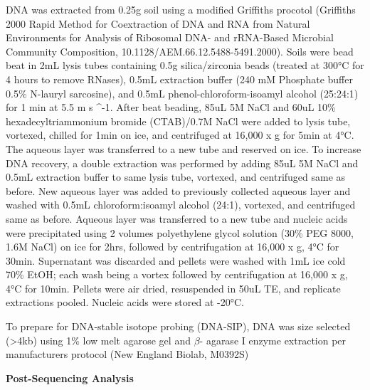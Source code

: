 DNA was extracted from 0.25g soil using a modified Griffiths procotol (Griffiths 2000 Rapid Method for Coextraction of DNA and RNA from Natural Environments for Analysis of Ribosomal DNA- and rRNA-Based Microbial Community Composition, 10.1128/AEM.66.12.5488-5491.2000).  Soils were bead beat in 2mL lysis tubes containing 0.5g silica/zirconia beads (treated at 300°C for 4 hours to remove RNases), 0.5mL extraction buffer (240 mM Phosphate buffer
0.5\% N-lauryl sarcosine), and 0.5mL phenol-chloroform-isoamyl alcohol (25:24:1) for 1 min at 5.5 m s ^{-1}.  After beat beading, 85uL 5M NaCl and 60uL 10\% hexadecyltriammonium bromide (CTAB)/0.7M NaCl were added to lysis tube, vortexed, chilled for 1min on ice, and centrifuged at 16,000 x g for 5min at 4°C.  The aqueous layer was transferred to a new tube and reserved on ice.  To increase DNA recovery, a double extraction was performed by adding 85uL 5M NaCl and 0.5mL extraction buffer to same lysis tube, vortexed, and centrifuged same as before.  New aqueous layer was added to previously collected aqueous layer and washed with 0.5mL chloroform:isoamyl alcohol (24:1), vortexed, and centrifuged same as before.  Aqueous layer was transferred to a new tube and nucleic acids were precipitated using 2 volumes polyethylene glycol solution (30\% PEG 8000, 1.6M NaCl) on ice for 2hrs, followed by centrifugation at 16,000 x g, 4°C for 30min.  Supernatant was discarded and pellets were washed with 1mL ice cold 70\% EtOH; each wash being a vortex followed by centrifugation at 16,000 x g, 4°C for 10min.  Pellets were air dried, resuspended in 50uL TE, and replicate extractions pooled.  Nucleic acids were stored at -20°C.                   

To prepare for DNA-stable isotope probing (DNA-SIP), DNA was size selected (>4kb) using 1\% low melt agarose gel and $\beta$- agarase I enzyme extraction per manufacturers protocol (New England Biolab, M0392S)

\textbf{Post-Sequencing Analysis}
 